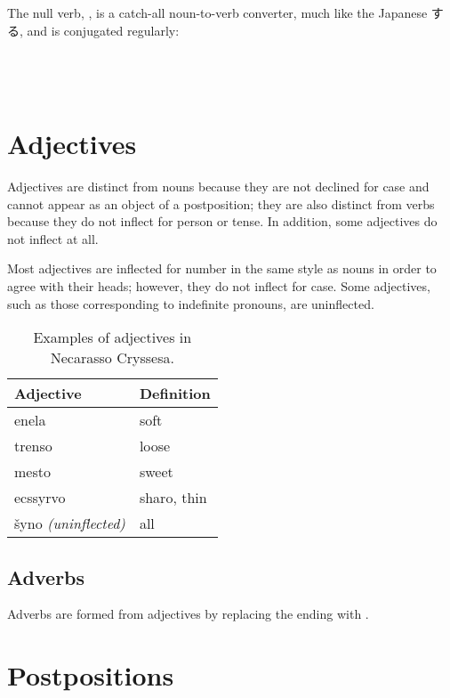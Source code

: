 \documentclass{book}
\begin{document}
The null verb, , is a catch-all noun-to-verb converter, much like the Japanese \textsf{する}, and is conjugated regularly: \\
~\\
    \\
    \\
  

\chapter{Adjectives}

Adjectives are distinct from nouns because they are not declined for case and cannot appear as an object of a postposition; they are also distinct from verbs because they do not inflect for person or tense. In addition, some adjectives do not inflect at all.

Most adjectives are inflected for number in the same style as nouns in order to agree with their heads; however, they do not inflect for case. Some adjectives, such as those corresponding to indefinite pronouns, are uninflected.

\begin{table}[h]
  \caption{Examples of adjectives in Necarasso Cryssesa.}
  \centering
  \begin{tabular}{|l|l|}
    \hline
    Adjective & Definition \\
    \hline
    enela & soft \\
    trenso & loose \\
    mesto & sweet \\
    ecssyrvo & sharo, thin \\
    šyno \emph{(uninflected)} & all \\
    \hline
  \end{tabular}
\end{table}

\section{Adverbs}

Adverbs are formed from adjectives by replacing the ending with .

\chapter{Postpositions}
\end{document}
